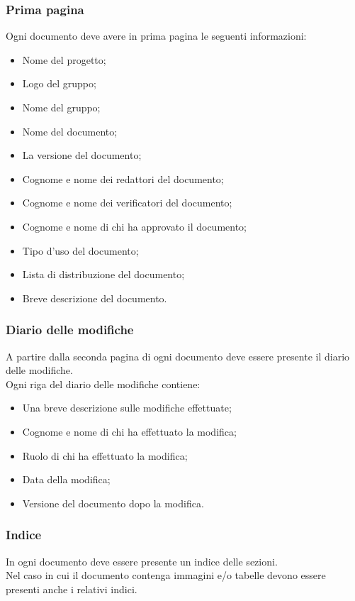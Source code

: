 \subsubsection{Prima pagina}
Ogni documento deve avere in prima pagina le seguenti informazioni:
\begin{itemize}
	\item Nome del progetto;
	\item Logo del gruppo;
	\item Nome del gruppo;
	\item Nome del documento;
	\item La versione del documento;
	\item Cognome e nome dei redattori del documento;
	\item Cognome e nome dei verificatori del documento;
	\item Cognome e nome di chi ha approvato il documento;
	\item Tipo d'uso del documento;
	\item Lista di distribuzione del documento;
	\item Breve descrizione del documento.
\end{itemize}
\subsubsection{Diario delle modifiche}
A partire dalla seconda pagina di ogni documento deve essere presente il diario delle modifiche.\\
Ogni riga del diario delle modifiche contiene:
\begin{itemize}
	\item Una breve descrizione sulle modifiche effettuate;
	\item Cognome e nome di chi ha effettuato la modifica;
	\item Ruolo di chi ha effettuato la modifica;
	\item Data della modifica;
	\item Versione del documento dopo la modifica.
\end{itemize}

\subsubsection{Indice}
In ogni documento deve essere presente un indice delle sezioni.\\
Nel caso in cui il documento contenga immagini e/o tabelle devono essere presenti anche i relativi indici.

